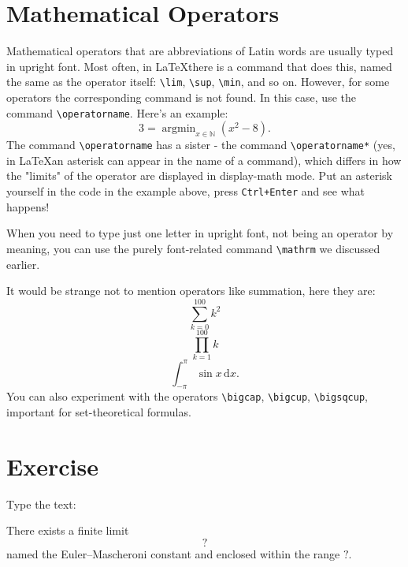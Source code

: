 \section{Mathematical Operators}
\par Mathematical operators that are abbreviations of Latin words are usually typed in upright font. Most often, in \LaTeX there is a command that does this, named the same as the operator itself: \verb"\lim", \verb"\sup", \verb"\min", and so on. However, for some operators the corresponding command is not found. In this case, use the command \verb"\operatorname".\index{\operatorname} Here's an example: \[3=\operatorname{argmin}_{x\in\mathbb{N}}(x^2-8).\] The command \verb"\operatorname" has a sister - the command \verb"\operatorname*" (yes, in \LaTeX an asterisk can appear in the name of a command), which differs in how the "limits" of the operator are displayed in display-math mode. Put an asterisk yourself in the code in the example above, press \verb"Ctrl+Enter" and see what happens!
\par When you need to type just one letter in upright font, not being an operator by meaning, you can use the purely font-related command \verb"\mathrm" we discussed earlier.\index{\mathrm}
\par It would be strange not to mention operators like summation, here they are:
\[\sum_{k=0}^{100} k^2\]
\[\prod_{k=1}^{100} k\]
\[\int_{-\pi}^\pi\sin x\,\mathrm{d}x.\]
You can also experiment with the operators \verb"\bigcap", \verb"\bigcup", \verb"\bigsqcup", important for set-theoretical formulas.

\section{Exercise}
\begin{staticpart}
Type the text: 
\end{staticpart}
\par There exists a finite limit \[?\] named the Euler–Mascheroni constant and enclosed within the range \(?\).

